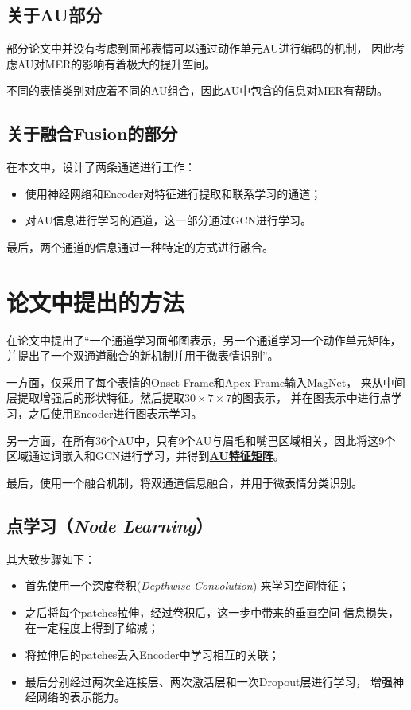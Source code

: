 \documentclass[AutoFakeBold]{MyFormat}
\begin{document}
\section{关于AU部分}
\par 部分论文中并没有考虑到面部表情可以通过动作单元AU进行编码的机制，
因此考虑AU对MER的影响有着极大的提升空间。
\par 不同的表情类别对应着不同的AU组合，因此AU中包含的信息对MER有帮助。

\section{关于融合Fusion的部分}
\par 在本文中，设计了两条通道进行工作：
\begin{itemize}
    \item 使用神经网络和Encoder对特征进行提取和联系学习的通道；
    \item 对AU信息进行学习的通道，这一部分通过GCN进行学习。
\end{itemize}
\par 最后，两个通道的信息通过一种特定的方式进行融合。



\chapter{论文中提出的方法}


\par 在论文中提出了“一个通道学习面部图表示，另一个通道学习一个动作单元矩阵，
并提出了一个双通道融合的新机制并用于微表情识别”。

\par 一方面，仅采用了每个表情的Onset Frame和Apex Frame输入MagNet，
来从中间层提取增强后的形状特征。然后提取$30\times 7\times 7$的图表示，
并在图表示中进行点学习，之后使用Encoder进行图表示学习。
\par 另一方面，在所有36个AU中，只有9个AU与眉毛和嘴巴区域相关，因此将这9个
区域通过词嵌入和GCN进行学习，并得到\textbf{\Large \underline{AU特征矩阵}}。
\par 最后，使用一个融合机制，将双通道信息融合，并用于微表情分类识别。



\section{点学习（\textit{Node Learning}）}

\par 其大致步骤如下：
\begin{itemize}
    \item 首先使用一个深度卷积(\textit{Depthwise Convolution})
    来学习空间特征；
    \item 之后将每个patches拉伸，经过卷积后，这一步中带来的垂直空间
    信息损失，在一定程度上得到了缩减；
    \item 将拉伸后的patches丢入Encoder中学习相互的关联；
    \item 最后分别经过两次全连接层、两次激活层和一次Dropout层进行学习，
    增强神经网络的表示能力。
\end{itemize}
\end{document}
